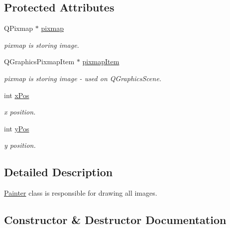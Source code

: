 \subsection*{Protected Attributes}
\begin{DoxyCompactItemize}
\item 
\mbox{\label{class_painter_a1af64c4dbd97392dce9940712463d188}} 
Q\+Pixmap $\ast$ \mbox{\hyperlink{class_painter_a1af64c4dbd97392dce9940712463d188}{pixmap}}
\begin{DoxyCompactList}\small\item\em pixmap is storing image. \end{DoxyCompactList}\item 
\mbox{\label{class_painter_a1f3af3b5da3bea41c3fcffc1ad0d6166}} 
Q\+Graphics\+Pixmap\+Item $\ast$ \mbox{\hyperlink{class_painter_a1f3af3b5da3bea41c3fcffc1ad0d6166}{pixmap\+Item}}
\begin{DoxyCompactList}\small\item\em pixmap is storing image -\/ used on Q\+Graphics\+Scene. \end{DoxyCompactList}\item 
\mbox{\label{class_painter_aae86011c3335c3d63da42d557938ce7d}} 
int \mbox{\hyperlink{class_painter_aae86011c3335c3d63da42d557938ce7d}{x\+Pos}}
\begin{DoxyCompactList}\small\item\em x position. \end{DoxyCompactList}\item 
\mbox{\label{class_painter_ad38c8bd94f3561b4ffb490ad06935ff2}} 
int \mbox{\hyperlink{class_painter_ad38c8bd94f3561b4ffb490ad06935ff2}{y\+Pos}}
\begin{DoxyCompactList}\small\item\em y position. \end{DoxyCompactList}\end{DoxyCompactItemize}


\subsection{Detailed Description}
\mbox{\hyperlink{class_painter}{Painter}} class is responsible for drawing all images. 

\subsection{Constructor \& Destructor Documentation}
\mbox{\label{class_painter_a32e59ad4d0e130f57c419bd9e9c84675}} 
